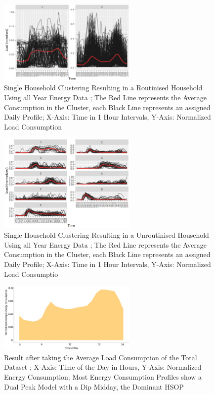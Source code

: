 \begin{figure}
    \centering
    \includegraphics[width=0.6\textwidth]{figures/malatesta_hsop/malatesta_routinisedHousehold.jpg}
    \caption{Single Household Clustering Resulting in a Routinised Household Using all Year Energy Data \cite{MAL-HBP};
    The Red Line represents the Average Consumption in the Cluster, each Black Line represents an assigned Daily Profile;
    X-Axis: Time in 1 Hour Intervals, Y-Axis: Normalized Load Consumption}
    \label{fig:routinized_household}
\end{figure}

\begin{figure}
    \centering
    \includegraphics[width=0.6\textwidth]{figures/malatesta_hsop/malatesta_unroutinisedHousehold.jpg}
    \caption{Single Household Clustering Resulting in a Unroutinised Household Using all Year Energy Data \cite{MAL-HBP};
    The Red Line represents the Average Consumption in the Cluster, each Black Line represents an assigned Daily Profile;
    X-Axis: Time in 1 Hour Intervals, Y-Axis: Normalized Load Consumptio}
    \label{fig:non_routinized_household}
\end{figure}

\begin{figure}
    \centering
    \includegraphics[width=0.6\textwidth]{figures/malatesta_hsop/malatesta_totalDataAveraging.jpg}
    \caption{Result after taking the Average Load Consumption of the Total Dataset \cite{MAL-HBP};
    X-Axis: Time of the Day in Hours, Y-Axis: Normalized Energy Consumption;
    Most Energy Consumption Profiles show a Dual Peak Model with a Dip Midday, the Dominant HSOP}
    \label{fig:total_data_averaging}
\end{figure}

